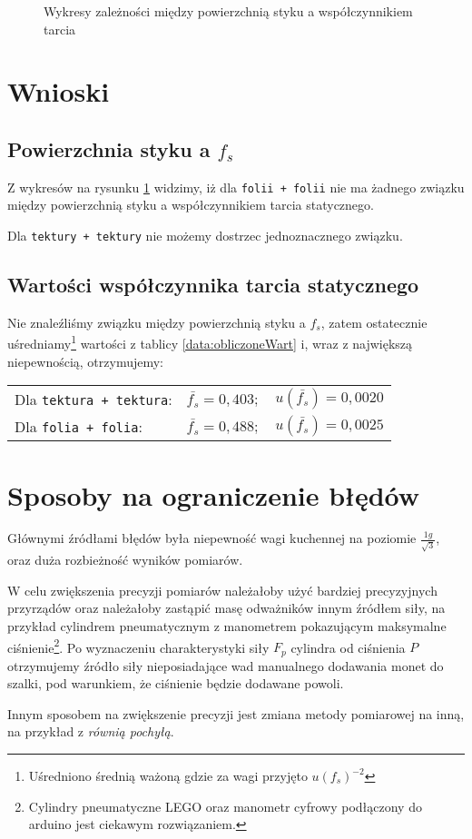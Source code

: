 \documentclass[a4paper,12pt]{article}
\begin{document}
\begin{figure}
	\resizebox{\textwidth}{!}{%
	}
	\centering
	\caption{Wykresy zależności między powierzchnią styku a współczynnikiem tarcia}\label{plot:fsArea}
\end{figure}

\section{Wnioski}
\subsection*{Powierzchnia styku a $f_s$}
Z wykresów na rysunku \ref{plot:fsArea} widzimy, iż dla \texttt{folii + folii} nie ma żadnego związku między powierzchnią styku a współczynnikiem tarcia statycznego.

Dla \texttt{tektury + tektury} nie możemy dostrzec jednoznacznego związku.

\subsection*{Wartości współczynnika tarcia statycznego}

Nie znaleźliśmy związku między powierzchnią styku a $f_s$, zatem ostatecznie uśredniamy\footnote{Uśredniono średnią ważoną gdzie za wagi przyjęto $u\left(f_s\right)^{-2}$} wartości z tablicy \ref{data:obliczoneWart} i, wraz z największą niepewnością, otrzymujemy:

\vspace{.5cm}
\begin{tabular}{lll}
	Dla \texttt{tektura + tektura}: &	$\bar{f_s} = 0,403;$ &	$u\left(\bar{f_s}\right) = 0,0020$\\
	Dla \texttt{folia + folia}: &	$\bar{f_s} = 0,488;$ &	$u\left(\bar{f_s}\right) = 0,0025$\\
\end{tabular}

\section{Sposoby na ograniczenie błędów}

Głównymi źródłami błędów była niepewność wagi kuchennej na poziomie $\frac{1g}{\sqrt{3}}$, oraz duża rozbieżność wyników pomiarów.

W celu zwiększenia precyzji pomiarów należałoby użyć bardziej precyzyjnych przyrządów oraz należałoby zastąpić masę odważników innym źródłem siły, na przykład cylindrem pneumatycznym z manometrem pokazującym maksymalne ciśnienie\footnote{Cylindry pneumatyczne LEGO oraz manometr cyfrowy podłączony do arduino jest ciekawym rozwiązaniem.}. Po wyznaczeniu charakterystyki siły $F_p$ cylindra od ciśnienia $P$ otrzymujemy źródło siły nieposiadające wad manualnego dodawania monet do szalki, pod warunkiem, że ciśnienie będzie dodawane powoli. 

Innym sposobem na zwiększenie precyzji jest zmiana metody pomiarowej na inną, na przykład z \emph{równią pochyłą}.
\end{document}
